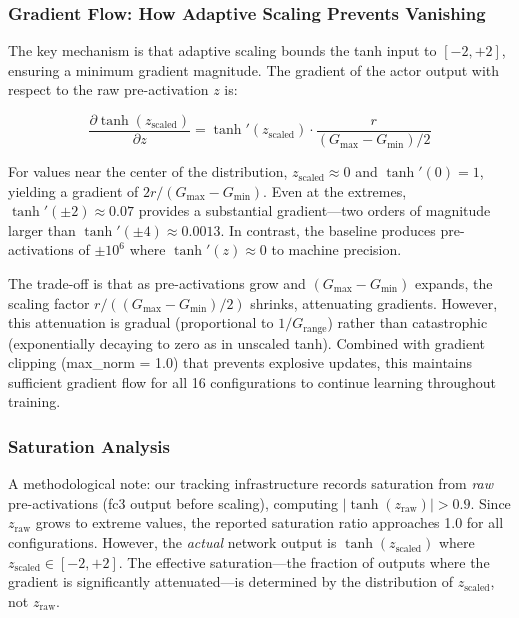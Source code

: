 \subsubsection{Gradient Flow: How Adaptive Scaling Prevents Vanishing}

The key mechanism is that adaptive scaling bounds the tanh input to $[-2, +2]$, ensuring a minimum gradient magnitude. The gradient of the actor output with respect to the raw pre-activation $z$ is:

\begin{equation}
\frac{\partial \tanh(z_\text{scaled})}{\partial z} = \tanh'(z_\text{scaled}) \cdot \frac{r}{(G_\text{max} - G_\text{min})/2}
\label{eq:adaptive_gradient}
\end{equation}

For values near the center of the distribution, $z_\text{scaled} \approx 0$ and $\tanh'(0) = 1$, yielding a gradient of $2r / (G_\text{max} - G_\text{min})$. Even at the extremes, $\tanh'(\pm 2) \approx 0.07$ provides a substantial gradient---two orders of magnitude larger than $\tanh'(\pm 4) \approx 0.0013$. In contrast, the baseline produces pre-activations of $\pm 10^6$ where $\tanh'(z) \approx 0$ to machine precision.

The trade-off is that as pre-activations grow and $(G_\text{max} - G_\text{min})$ expands, the scaling factor $r / ((G_\text{max} - G_\text{min})/2)$ shrinks, attenuating gradients. However, this attenuation is gradual (proportional to $1/G_\text{range}$) rather than catastrophic (exponentially decaying to zero as in unscaled tanh). Combined with gradient clipping (max\_norm = 1.0) that prevents explosive updates, this maintains sufficient gradient flow for all 16 configurations to continue learning throughout training.

\subsubsection{Saturation Analysis}

A methodological note: our tracking infrastructure records saturation from \textit{raw} pre-activations (fc3 output before scaling), computing $|\tanh(z_\text{raw})| > 0.9$. Since $z_\text{raw}$ grows to extreme values, the reported saturation ratio approaches 1.0 for all configurations. However, the \textit{actual} network output is $\tanh(z_\text{scaled})$ where $z_\text{scaled} \in [-2, +2]$. The effective saturation---the fraction of outputs where the gradient is significantly attenuated---is determined by the distribution of $z_\text{scaled}$, not $z_\text{raw}$.

